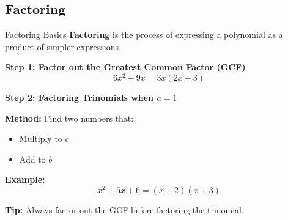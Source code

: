 \documentclass{beamer}
\begin{document}
\begin{frame}
\section{Factoring}
\end{frame}
\begin{frame}{Factoring Basics}
\small
\textbf{Factoring} is the process of expressing a polynomial as a product of simpler expressions.

\vspace{0.3cm}
\textbf{Step 1: Factor out the Greatest Common Factor (GCF)}
\[
6x^2 + 9x = 3x(2x + 3)
\]

\vspace{0.3cm}
\textbf{Step 2: Factoring Trinomials when $a = 1$}

\textbf{Method:} Find two numbers that:
\begin{itemize}
    \item Multiply to $c$
    \item Add to $b$
\end{itemize}

\vspace{0.2cm}
\textbf{Example:}
\[
x^2 + 5x + 6 = (x + 2)(x + 3)
\]

\vspace{0.3cm}
\textbf{Tip:} Always factor out the GCF before factoring the trinomial.
\end{frame}
\end{document}
